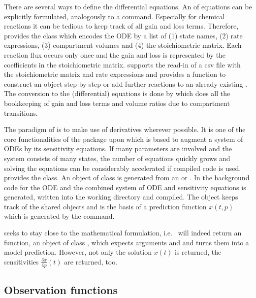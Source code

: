 \documentclass[article]{jss}
\begin{document}
There are several ways to define the differential equations. An  of equations can be explicitly formulated, analogously to a  command. Especially for chemical reactions it can be tedious to keep track of all gain and loss terms. Therefore,  provides the  class which encodes the ODE by a list of (1) state names, (2) rate expressions, (3) compartment volumes and (4) the stoichiometric matrix. Each reaction flux occurs only once and the gain and loss is represented by the coefficients in the stoichiometric matrix.  supports the read-in of a csv file with the stoichiometric matrix and rate expressions and provides a function  to construct an  object step-by-step or add further reactions to an already existing . The conversion to the (differential) equations is done by  which does all the bookkeeping of gain and loss terms and volume ratios due to compartment transitions.

The paradigm of  is to make use of derivatives wherever possible. It is one of the core functionalities of the  package upon which  is based to augment a system of ODEs by its sensitivity equations. If many parameters are involved and the system consists of many states, the number of equations quickly grows and solving the equations can be considerably accelerated if compiled code is used.  provides the  class. An object of class  is generated from an  or . In the background  code for the ODE and the combined system of ODE and sensitivity equations is generated, written into the working directory and compiled. The  object keeps track of the shared objects and is the basis of a prediction function $x(t, p)$ which is generated by the  command.

 seeks to stay close to the mathematical formulation, i.e.~ will indeed return an  function, an object of class , which expects arguments  and  and turns them into a model prediction. However, not only the solution $x(t)$ is returned, the sensitivities $\frac{\partial x}{\partial p}(t)$ are returned, too.

\subsection{Observation functions}
\end{document}
